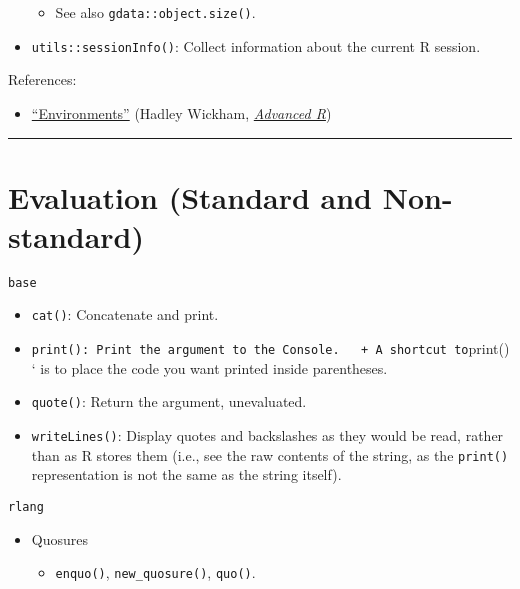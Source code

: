\documentclass[
]{book}
\providecommand{\tightlist}{%
  \setlength{\itemsep}{0pt}\setlength{\parskip}{0pt}}
\begin{document}
\begin{itemize}
  \begin{itemize}
  \tightlist
  \item
    See also \texttt{gdata::object.size()}.
  \end{itemize}
\item
  \texttt{utils::sessionInfo()}: Collect information about the current R session.
\end{itemize}

References:

\begin{itemize}
\tightlist
\item
  \href{http://adv-r.had.co.nz/Environments.html\#environments}{``Environments''} (Hadley Wickham, \href{http://adv-r.had.co.nz/}{\emph{Advanced R}})
\end{itemize}

\begin{center}\rule{0.5\linewidth}{0.5pt}\end{center}

\hypertarget{evaluation-standard-and-non-standard}{%
\section{Evaluation (Standard and Non-standard)}\label{evaluation-standard-and-non-standard}}

\texttt{base}

\begin{itemize}
\tightlist
\item
  \texttt{cat()}: Concatenate and print.
\item
  \texttt{print():\ Print\ the\ argument\ to\ the\ Console.\ \ \ +\ A\ shortcut\ to}print()` is to place the code you want printed inside parentheses.
\item
  \texttt{quote()}: Return the argument, unevaluated.
\item
  \texttt{writeLines()}: Display quotes and backslashes as they would be read, rather than as R stores them (i.e., see the raw contents of the string, as the \texttt{print()} representation is not the same as the string itself).
\end{itemize}

\texttt{rlang}

\begin{itemize}
\tightlist
\item
  Quosures

  \begin{itemize}
  \tightlist
  \item
    \texttt{enquo()}, \texttt{new\_quosure()}, \texttt{quo()}.
  \end{itemize}
\end{itemize}
\end{document}
